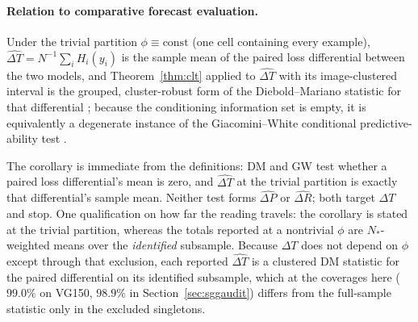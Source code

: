 \paragraph{Relation to comparative forecast evaluation.}
\begin{corollary}\label{cor:dm}
Under the trivial partition $\phi\equiv\text{const}$ (one cell containing every
example), $\widehat{\Delta T}=N^{-1}\sum_iH_i(y_i)$ is the sample mean of the paired loss
differential between the two models, and
Theorem~\ref{thm:clt} applied to $\widehat{\Delta T}$
with its image-clustered interval is the grouped, cluster-robust form of the
Diebold--Mariano statistic for that differential \citep{diebold1995comparing}; because
the conditioning information set is empty, it is equivalently a degenerate instance of
the Giacomini--White conditional predictive-ability test \citep{giacomini2006tests}.
\end{corollary}
The corollary is immediate from the definitions: DM and GW test whether a paired loss
differential's mean is zero, and $\widehat{\Delta T}$ at the trivial partition is exactly
that differential's sample mean. Neither test forms $\widehat{\Delta P}$ or
$\widehat{\Delta R}$; both target $\Delta T$ and stop. One qualification on how far the
reading travels: the corollary is stated at the trivial partition, whereas the totals
reported at a nontrivial $\phi$ are $N_*$-weighted means over the \emph{identified}
subsample. Because $\Delta T$ does not depend on $\phi$ except through that exclusion, each
reported $\widehat{\Delta T}$ is a clustered DM statistic for the paired differential on its
identified subsample, which at the coverages here ($99.0\%$ on VG150, $98.9\%$ in
Section~\ref{sec:sggaudit}) differs from the full-sample statistic only in the excluded
singletons.


